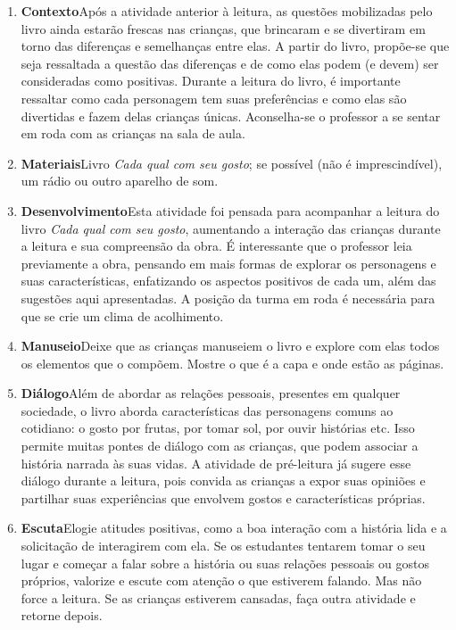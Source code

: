 \documentclass[11pt]{extarticle}
\begin{document}
\begin{enumerate}
\item \textbf{Contexto}\quad Após a atividade anterior à leitura, as questões mobilizadas pelo livro ainda estarão frescas nas crianças, que brincaram e se divertiram em torno das diferenças e semelhanças entre elas. A partir do livro, propõe-se que seja ressaltada a questão das diferenças e de como elas podem (e devem) ser consideradas como positivas. Durante a leitura do livro, é importante ressaltar como cada personagem tem suas preferências e como elas são divertidas e fazem delas crianças únicas. Aconselha-se o professor a se sentar em roda com as crianças na sala de aula.

\item \textbf{Materiais}\quad Livro \textit{Cada qual com seu gosto}; se possível (não é imprescindível), um rádio ou outro aparelho de som.


\item \textbf{Desenvolvimento}\quad Esta atividade foi pensada para acompanhar a leitura do livro \textit{Cada qual com seu gosto}, aumentando a interação das crianças durante a leitura e sua compreensão da obra. É interessante que o professor leia previamente a obra, pensando em mais formas de explorar os personagens e suas características, enfatizando os aspectos positivos de cada um, além das sugestões aqui apresentadas.
A posição da turma em roda é necessária para que se crie um clima de acolhimento. 
 
\item \textbf{Manuseio}\quad Deixe que as crianças manuseiem o livro 
e explore com elas todos os elementos que o compõem. Mostre o que é a 
capa e onde estão as páginas.

\item \textbf{Diálogo}\quad Além de abordar as relações pessoais, presentes em qualquer sociedade, o livro aborda características das personagens comuns ao cotidiano: o gosto por frutas, por tomar sol, por ouvir histórias etc. Isso permite muitas pontes de diálogo com as crianças, que podem associar a história narrada às suas vidas. A atividade de pré-leitura já sugere esse diálogo durante a leitura, pois convida as crianças a expor suas opiniões e partilhar suas experiências que envolvem gostos e características próprias.

\item \textbf{Escuta}\quad Elogie atitudes positivas, como 
a boa interação com a história lida e a solicitação de interagirem com ela. Se os estudantes tentarem 
tomar o seu lugar e começar a falar sobre a história ou suas relações pessoais ou gostos próprios, valorize e escute com atenção o que estiverem falando. Mas não 
force a leitura. Se as crianças estiverem cansadas, faça outra atividade 
e retorne depois. 


\end{enumerate}
\end{document}
